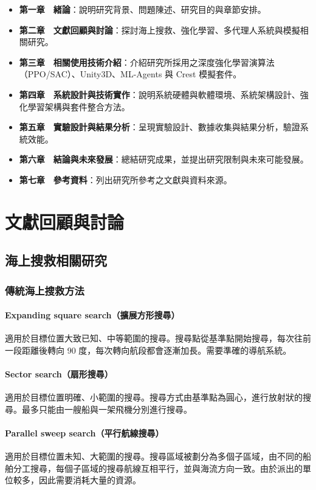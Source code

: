\documentclass[12pt,a4paper]{ctexart}
\begin{document}
\begin{itemize}
\item \textbf{第一章　緒論}：說明研究背景、問題陳述、研究目的與章節安排。
\item \textbf{第二章　文獻回顧與討論}：探討海上搜救、強化學習、多代理人系統與模擬相關研究。
\item \textbf{第三章　相關使用技術介紹}：介紹研究所採用之深度強化學習演算法（PPO/SAC）、Unity3D、ML-Agents 與 Crest 模擬套件。
\item \textbf{第四章　系統設計與技術實作}：說明系統硬體與軟體環境、系統架構設計、強化學習架構與套件整合方法。
\item \textbf{第五章　實驗設計與結果分析}：呈現實驗設計、數據收集與結果分析，驗證系統效能。
\item \textbf{第六章　結論與未來發展}：總結研究成果，並提出研究限制與未來可能發展。
\item \textbf{第七章　參考資料}：列出研究所參考之文獻與資料來源。
\end{itemize}

\newpage

\section{文獻回顧與討論}

\subsection{海上搜救相關研究}

\subsubsection{傳統海上搜救方法}
\paragraph{Expanding square search（擴展方形搜尋）}  
適用於目標位置大致已知、中等範圍的搜尋。搜尋點從基準點開始搜尋，每次往前一段距離後轉向 90 度，每次轉向航段都會逐漸加長。需要準確的導航系統。

\paragraph{Sector search（扇形搜尋）}  
適用於目標位置明確、小範圍的搜尋。搜尋方式由基準點為圓心，進行放射狀的搜尋。最多只能由一艘船與一架飛機分別進行搜尋。

\paragraph{Parallel sweep search（平行航線搜尋）}  
適用於目標位置未知、大範圍的搜尋。搜尋區域被劃分為多個子區域，由不同的船舶分工搜尋，每個子區域的搜尋航線互相平行，並與海流方向一致。由於派出的單位較多，因此需要消耗大量的資源。
\end{document}
